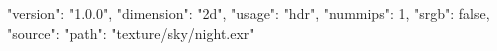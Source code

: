 {
  "version": "1.0.0",
  "dimension": "2d",
  "usage": "hdr",
  "nummips": 1,
  "srgb": false,
  "source": {
    "path": "texture/sky/night.exr"
  }
}